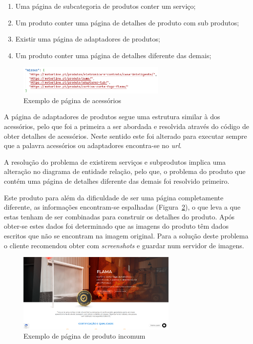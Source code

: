 \begin{enumerate}
    \item Uma página de subcategoria de produtos conter um serviço;
    \item Um produto conter uma página de detalhes de produto com sub produtos;
    \item Existir uma página de adaptadores de produtos;
    \item Um produto conter uma página de detalhes diferente das demais;
\end{enumerate}

\begin{figure}[htb]
    \centering
    
    \includegraphics[width=0.65\textwidth]{images/implementacao/scraper/melhor_corrida.png}
    \caption{Exemplo de página de acessórios}
    \label{fig:59}
\end{figure}



A página de adaptadores de produtos segue uma estrutura similar à dos acessórios, pelo que foi a primeira a ser abordada e resolvida através do código de obter detalhes de acessórios. Neste sentido este foi alterado para executar sempre que a palavra acessórios ou adaptadores encontra-se no \textit{url}.

A resolução do problema de existirem serviços e subprodutos implica uma alteração no diagrama de entidade relação, pelo que, o problema do produto que contém uma página de detalhes diferente das demais foi resolvido primeiro. 

Este produto para além da dificuldade de ser uma página completamente diferente, as informações encontram-se espalhadas (Figura~\ref*{fig:60}), o que leva a que estas tenham de ser combinadas para construir os detalhes do produto. Após obter-se estes dados foi determinado que as imagens do produto têm dados escritos que não se encontram na imagem original. Para a solução deste problema o cliente recomendou obter com \textit{screenshots} e guardar num servidor de imagens.

\begin{figure}[htb]
    \centering
    \includegraphics[width=0.7\textwidth]{images/implementacao/scraper/flama.png}
    \caption{Exemplo de página de produto incomum}
    \label{fig:60}
\end{figure}


